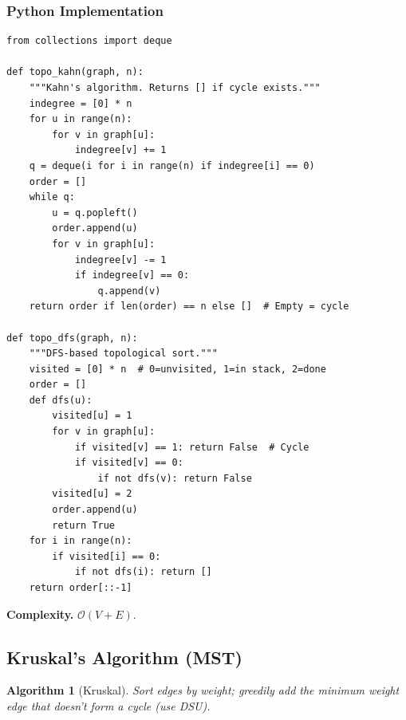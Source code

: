 \documentclass[10pt,a4paper]{article}
\theoremstyle{cpstyle}
\newtheorem{algorithm}[theorem]{Algorithm}
\newcommand{\bigO}[1]{\mathcal{O}\!\left(#1\right)}
\begin{document}
\subsubsection{Python Implementation}
\begin{lstlisting}[caption={Topological Sort -- Kahn's BFS and DFS}]
from collections import deque

def topo_kahn(graph, n):
    """Kahn's algorithm. Returns [] if cycle exists."""
    indegree = [0] * n
    for u in range(n):
        for v in graph[u]:
            indegree[v] += 1
    q = deque(i for i in range(n) if indegree[i] == 0)
    order = []
    while q:
        u = q.popleft()
        order.append(u)
        for v in graph[u]:
            indegree[v] -= 1
            if indegree[v] == 0:
                q.append(v)
    return order if len(order) == n else []  # Empty = cycle

def topo_dfs(graph, n):
    """DFS-based topological sort."""
    visited = [0] * n  # 0=unvisited, 1=in stack, 2=done
    order = []
    def dfs(u):
        visited[u] = 1
        for v in graph[u]:
            if visited[v] == 1: return False  # Cycle
            if visited[v] == 0:
                if not dfs(v): return False
        visited[u] = 2
        order.append(u)
        return True
    for i in range(n):
        if visited[i] == 0:
            if not dfs(i): return []
    return order[::-1]
\end{lstlisting}

\textbf{Complexity.} $\bigO{V+E}$.

\subsection{Kruskal's Algorithm (MST)}

\begin{algorithm}[Kruskal]
Sort edges by weight; greedily add the minimum weight edge that doesn't form a cycle (use DSU).
\end{algorithm}
\end{document}
